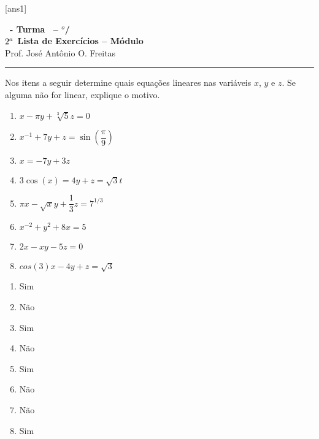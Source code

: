 \documentclass[12pt]{exam}
\begin{document}
  [ans1]
  \begin{center}
    {\Large\bf \disciplina\ - Turma \turma\ -- \semestre$^{o}$/\ano} \\ \vspace{9pt} {\large\bf
        $2^a$ Lista de Exercícios -- Módulo \numeromodulo}\\ \vspace{9pt} Prof. José Antônio O. Freitas
  \end{center}
  \hrule


\begin{exercicio}
  Nos itens a seguir determine quais equações lineares nas variáveis $x$, $y$ e $z$. Se alguma não for linear, explique o motivo.
  \begin{multicols}{2}
  \begin{enumerate}[label={\alph*})]
    \item $x - \pi y + \sqrt[3]{5}z = 0$
    \item $x^{-1} + 7y + z = \sin(\dfrac{\pi}{9})$
    \item $x = -7y + 3z$
    \item $3\cos(x) = 4y + z = \sqrt{3}t$
    \item $\pi x - \sqrt{x}y + \dfrac{1}{3}z = 7^{1/3}$
    \item $x^{-2} + y^2 + 8x = 5$
    \item $2x - xy - 5z = 0$
    \item $cos(3)x - 4y + z = \sqrt{3}$
  \end{enumerate}
\end{multicols}
  \begin{solucao}
    \begin{enumerate}[label={\alph*})]
      \item Sim
      \item Não
      \item Sim
      \item Não
      \item Sim
      \item Não
      \item Não
      \item Sim
    \end{enumerate}
  \end{solucao}
\end{exercicio}
\end{document}
